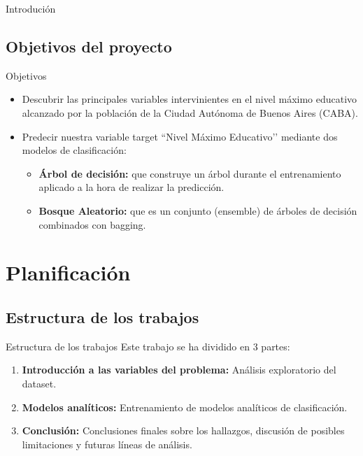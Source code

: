 \documentclass[pdf]{beamer}
\begin{document}
{\begin{frame}{Introdución}
\end{frame}

    \subsection{Objetivos del proyecto}

\begin{frame}{Objetivos}

    \begin{itemize}
        \justifying%
        \item Descubrir las principales variables intervinientes en el nivel máximo educativo alcanzado por la población de la Ciudad Autónoma de Buenos Aires (CABA).
        
        \item Predecir nuestra variable target ``Nivel Máximo Educativo’’ mediante dos modelos de clasificación:
        \begin{itemize}
            \justifying%
            \item \textbf{Árbol de decisión:} que construye un árbol durante el entrenamiento aplicado a la hora de realizar la predicción.
            \item \textbf{Bosque Aleatorio:} que es un conjunto (ensemble) de árboles de decisión combinados con bagging.
        \end{itemize}
    \end{itemize}
\end{frame}

\section{Planificación}

    \subsection*{Estructura de los trabajos}

\begin{frame}{Estructura de los trabajos}
    Este trabajo se ha dividido en 3 partes:
    \begin{enumerate}
        \justifying%
        \item \textbf{Introducción a las variables del problema:} Análisis exploratorio del dataset. 
        \item \textbf{Modelos analíticos:} Entrenamiento de modelos analíticos de clasificación.
        \item \textbf{Conclusión:} Conclusiones finales sobre los hallazgos, discusión de posibles limitaciones y futuras líneas de análisis.
        

\end{enumerate}
\end{frame}}
\end{document}
